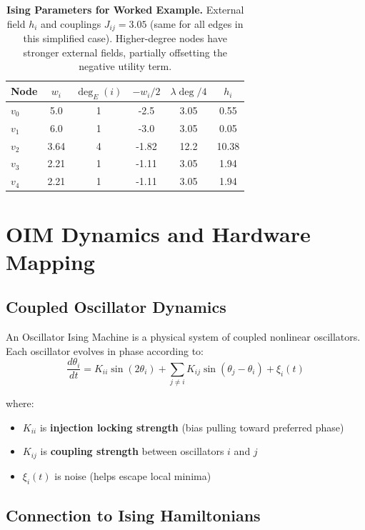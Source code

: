 \begin{table}[H]
\centering
\small
\begin{tabular}{lccccc}
\toprule
\textbf{Node} & $w_i$ & $\deg_E(i)$ & $-w_i/2$ & $\lambda \deg/4$ & $h_i$ \\
\midrule
$v_0$ & 5.0 & 1 & -2.5 & 3.05 & 0.55 \\
$v_1$ & 6.0 & 1 & -3.0 & 3.05 & 0.05 \\
$v_2$ & 3.64 & 4 & -1.82 & 12.2 & 10.38 \\
$v_3$ & 2.21 & 1 & -1.11 & 3.05 & 1.94 \\
$v_4$ & 2.21 & 1 & -1.11 & 3.05 & 1.94 \\
\bottomrule
\end{tabular}
\caption{\textbf{Ising Parameters for Worked Example.} External field $h_i$ and couplings $J_{ij} = 3.05$ (same for all edges in this simplified case). Higher-degree nodes have stronger external fields, partially offsetting the negative utility term.}
\label{tab:ising-params}
\end{table}

\section{OIM Dynamics and Hardware Mapping}
\label{sec:oim-dynamics}

\subsection{Coupled Oscillator Dynamics}

An Oscillator Ising Machine is a physical system of coupled nonlinear oscillators. Each oscillator evolves in phase according to:
\[
\frac{d\theta_i}{dt} = K_{ii} \sin(2\theta_i) + \sum_{j \neq i} K_{ij} \sin(\theta_j - \theta_i) + \xi_i(t)
\]

where:
\begin{itemize}
\item $K_{ii}$ is \textbf{injection locking strength} (bias pulling toward preferred phase)
\item $K_{ij}$ is \textbf{coupling strength} between oscillators $i$ and $j$
\item $\xi_i(t)$ is noise (helps escape local minima)
\end{itemize}

\subsection{Connection to Ising Hamiltonians}

